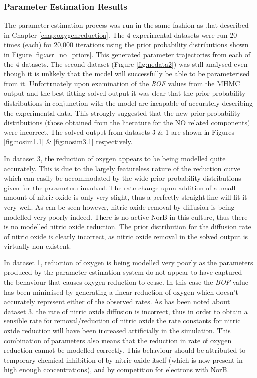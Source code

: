 \subsubsection{Parameter Estimation Results}
The parameter estimation process was run in the same fashion as that described in Chapter \ref{chap:oxygenreduction}. The 4 experimental datasets were run 20 times (each) for 20,000 iterations using the prior probability distributions shown in Figure \ref{fig:aer_no_priors}. This generated parameter trajectories from each of the 4 datasets. The second dataset (Figure \ref{fig:nodata2}) was still analysed even though it is unlikely that the model will successfully be able to be parameterised from it. Unfortunately upon examination of the \textit{BOF} values from the MHMC output and the best-fitting solved output it was clear that the prior probability distributions in conjunction with the model are incapable of accurately describing the experimental data. This strongly suggested that the new prior probability distributions (those obtained from the literature for the NO related components) were incorrect. The solved output from datasets 3 \& 1 are shown in Figures \ref{fig:nosim1.1} \& \ref{fig:nosim3.1} 
respectively.

In dataset 3, the reduction of oxygen appears to be being modelled quite accurately. This is due to the largely featureless nature of the reduction curve which can easily be accommodated by the wide prior probability distributions given for the parameters involved. The rate change upon addition of a small amount of nitric oxide is only very slight, thus a perfectly straight line will fit it very well. As can be seen however, nitric oxide removal by diffusion is being modelled very poorly indeed. There is no active NorB in this culture, thus there is no modelled nitric oxide reduction. The prior distribution for the diffusion rate of nitric oxide is clearly incorrect, as nitric oxide removal in the solved output is virtually non-existent.

In dataset 1, reduction of oxygen is being modelled very poorly as the parameters produced by the parameter estimation system do not appear to have captured the behaviour that causes oxygen reduction to cease. In this case the \textit{BOF} value has been minimised by generating a linear reduction of oxygen which doesn't accurately represent either of the observed rates. As has been noted about dataset 3, the rate of nitric oxide diffusion is incorrect, thus in order to obtain a sensible rate for removal/reduction of nitric oxide the rate constants for nitric oxide reduction will have been increased artificially in the simulation. This combination of parameters also means that the reduction in rate of oxygen reduction cannot be modelled correctly. This behaviour should be attributed to temporary chemical inhibition of \cbbthree{} by nitric oxide itself (which is now present in high enough concentrations), and by competition for electrons with NorB.

